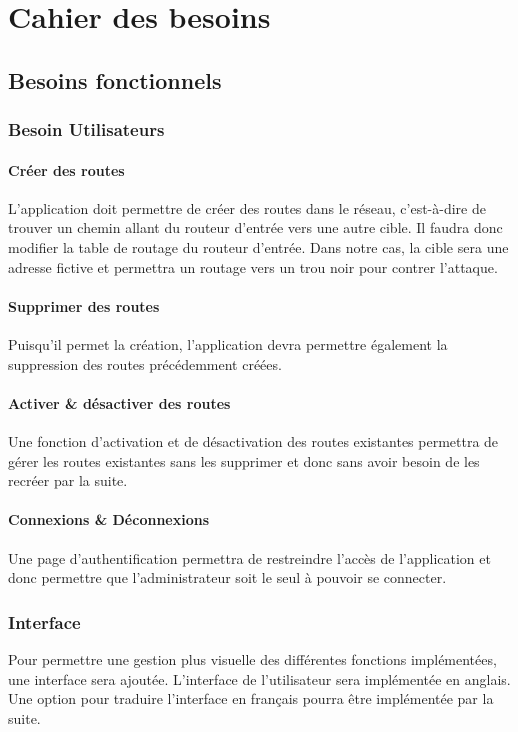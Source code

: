 \chapter{Cahier des besoins}

\section{Besoins fonctionnels}

\subsection{Besoin Utilisateurs}
\subsubsection{Créer des routes}
L'application doit permettre de créer des routes dans le réseau, c'est-à-dire de trouver un chemin allant du routeur d'entrée vers une autre cible. Il faudra donc modifier la table de routage du routeur d'entrée. Dans notre cas, la cible sera une adresse fictive et permettra un routage vers un trou noir pour contrer l'attaque.

\subsubsection{Supprimer des routes}
Puisqu'il permet la création, l'application devra permettre également la suppression des routes précédemment créées.

\subsubsection{Activer \& désactiver des routes}
Une fonction d'activation et de désactivation des routes existantes permettra de gérer les routes existantes sans les supprimer et donc sans avoir besoin de les recréer par la suite.

\subsubsection{Connexions \& Déconnexions}
Une page d'authentification permettra de restreindre l'accès de l'application et donc permettre que l'administrateur soit le seul à pouvoir se connecter.

\subsection{Interface}
Pour permettre une gestion plus visuelle des différentes fonctions implémentées, une interface sera ajoutée. L'interface de l'utilisateur sera implémentée en anglais. Une option pour traduire l'interface en français pourra être implémentée par la suite.

